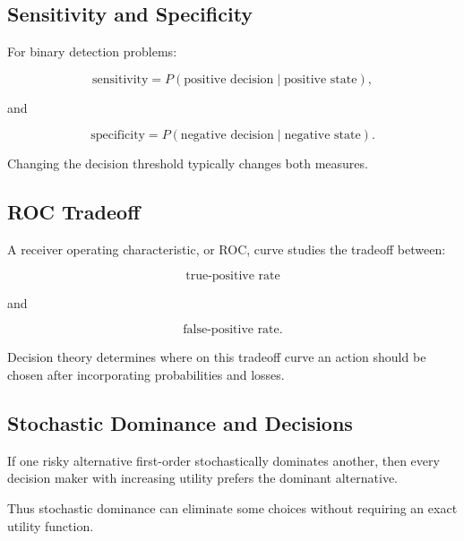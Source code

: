 \subsection{Sensitivity and Specificity}
\label{subsec:sensitivity-specificity-decision}

For binary detection problems:

\[
\boxed{
\text{sensitivity}
=
P
(
\text{positive decision}
\mid
\text{positive state}
),
}
\]

and

\[
\boxed{
\text{specificity}
=
P
(
\text{negative decision}
\mid
\text{negative state}
).
}
\]

Changing the decision threshold typically changes both measures.

\subsection{ROC Tradeoff}
\label{subsec:roc-decision-theory}

A receiver operating characteristic, or ROC, curve studies the tradeoff
between:

\[
\boxed{
\text{true-positive rate}
}
\]

and

\[
\boxed{
\text{false-positive rate}.
}
\]

Decision theory determines where on this tradeoff curve an action should be
chosen after incorporating probabilities and losses.

\subsection{Stochastic Dominance and Decisions}
\label{subsec:stochastic-dominance-decisions}

If one risky alternative first-order stochastically dominates another,
then every decision maker with increasing utility prefers the dominant
alternative.

Thus stochastic dominance can eliminate some choices without requiring an
exact utility function.

